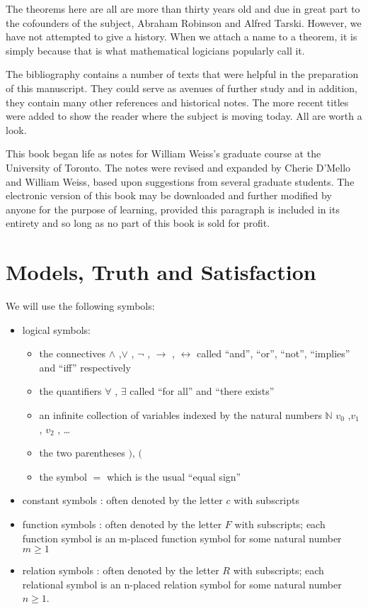 \documentclass[titlepage, oneside]{amsbook}
\theoremstyle{plain}
\theoremstyle{definition}
\theoremstyle{remark}
\begin{document}
The theorems here are all are more than thirty years old and due in
great part to the cofounders of the subject, Abraham Robinson and
Alfred Tarski.  However, we have not attempted to give a history.  When
we attach a name to a theorem, it is simply because that is what
mathematical logicians popularly call it.




The bibliography contains a number of texts that were helpful in the
preparation of this manuscript.  They could serve as avenues of further
study and in addition, they contain many other references and
historical notes.  The more recent titles were added to show the reader
where the subject is moving today.  All are worth a look. 

This book began life as notes for William Weiss's graduate course at
the University of Toronto. The notes were revised and expanded by
Cherie D'Mello and William Weiss, based upon suggestions from several
graduate students.  The electronic version of this book may be
downloaded and further modified by anyone for the purpose of learning,
provided this paragraph is included in its entirety and so long as no
part of this book is sold for profit.


\tableofcontents%
\setcounter{chapter}{-1}
\chapter{Models, Truth and Satisfaction}
We will use the following symbols:
\begin{itemize}
\item logical symbols:

\begin{itemize}
 \item the connectives $\wedge$ ,$\vee$ , $\neg$ , $\to$ ,
$\leftrightarrow$  called ``and'', ``or'', ``not'', ``implies'' and
``iff'' respectively
 \item the quantifiers $\forall$ , $\exists$ called ``for all'' and
``there exists''
\item an infinite
collection of variables
%
 indexed by the natural numbers $\mathbb{N}$ $v_{0}$ ,$v_{1}$
, $v_{2}$ , \dots

\item the two  parentheses  $)$, $($
 \item the symbol $=$ which is the usual ``equal sign''
 \end{itemize}

\item constant symbols : often denoted by the letter $c$ with
subscripts
\item function symbols : often denoted by the letter $F$ with
subscripts;
each function symbol is an m-placed func\-tion sym\-bol for some
natural 
number $m  \geq  1$
\item relation symbols : often denoted by the letter $R$ with
subscripts;  each relational symbol is an n-placed relation symbol for some natural 
number $n \geq 1$.

\end{itemize}
\end{document}
